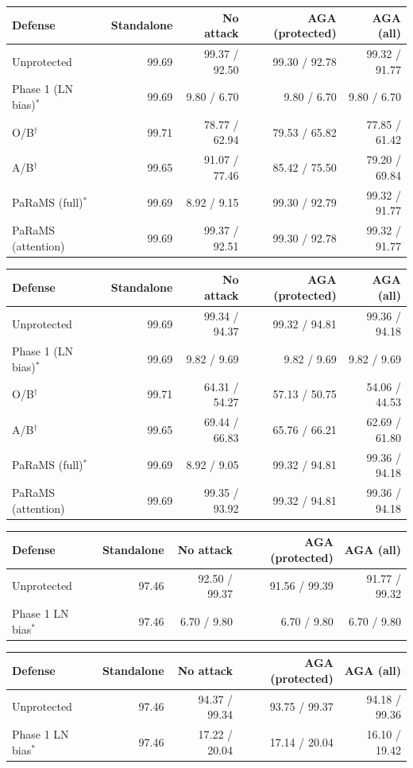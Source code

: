 \begin{tabular}{lrrrr}
\toprule
Defense & Standalone & No attack & AGA (protected) & AGA (all) \\
\midrule
Unprotected & 99.69 & 99.37 / 92.50 & 99.30 / 92.78 & 99.32 / 91.77 \\
Phase 1 (LN bias)$^{*}$ & 99.69 & 9.80 / 6.70 & 9.80 / 6.70 & 9.80 / 6.70 \\
O/B$^{\dagger}$ & 99.71 & 78.77 / 62.94 & 79.53 / 65.82 & 77.85 / 61.42 \\
A/B$^{\dagger}$ & 99.65 & 91.07 / 77.46 & 85.42 / 75.50 & 79.20 / 69.84 \\
PaRaMS (full)$^{*}$ & 99.69 & 8.92 / 9.15 & 99.30 / 92.79 & 99.32 / 91.77 \\
PaRaMS (attention) & 99.69 & 99.37 / 92.51 & 99.30 / 92.78 & 99.32 / 91.77 \\
\bottomrule
\end{tabular}

\begin{tabular}{lrrrr}
\toprule
Defense & Standalone & No attack & AGA (protected) & AGA (all) \\
\midrule
Unprotected & 99.69 & 99.34 / 94.37 & 99.32 / 94.81 & 99.36 / 94.18 \\
Phase 1 (LN bias)$^{*}$ & 99.69 & 9.82 / 9.69 & 9.82 / 9.69 & 9.82 / 9.69 \\
O/B$^{\dagger}$ & 99.71 & 64.31 / 54.27 & 57.13 / 50.75 & 54.06 / 44.53 \\
A/B$^{\dagger}$ & 99.65 & 69.44 / 66.83 & 65.76 / 66.21 & 62.69 / 61.80 \\
PaRaMS (full)$^{*}$ & 99.69 & 8.92 / 9.05 & 99.32 / 94.81 & 99.36 / 94.18 \\
PaRaMS (attention) & 99.69 & 99.35 / 93.92 & 99.32 / 94.81 & 99.36 / 94.18 \\
\bottomrule
\end{tabular}

\begin{tabular}{lrrrr}
\toprule
Defense & Standalone & No attack & AGA (protected) & AGA (all) \\
\midrule
Unprotected & 97.46 & 92.50 / 99.37 & 91.56 / 99.39 & 91.77 / 99.32 \\
Phase 1 LN bias$^{*}$ & 97.46 & 6.70 / 9.80 & 6.70 / 9.80 & 6.70 / 9.80 \\
\bottomrule
\end{tabular}

\begin{tabular}{lrrrr}
\toprule
Defense & Standalone & No attack & AGA (protected) & AGA (all) \\
\midrule
Unprotected & 97.46 & 94.37 / 99.34 & 93.75 / 99.37 & 94.18 / 99.36 \\
Phase 1 LN bias$^{*}$ & 97.46 & 17.22 / 20.04 & 17.14 / 20.04 & 16.10 / 19.42 \\
\bottomrule
\end{tabular}

